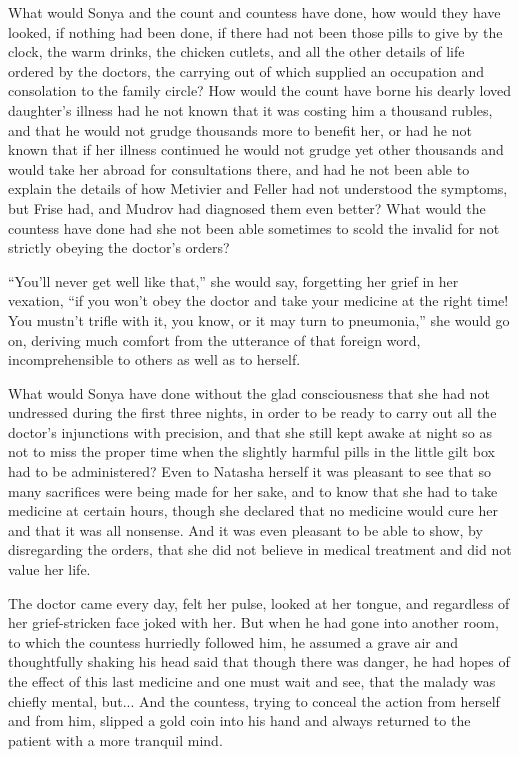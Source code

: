 What would Sonya and the count and countess have done, how would
they have looked, if nothing had been done, if there had not been
those pills to give by the clock, the warm drinks, the chicken
cutlets, and all the other details of life ordered by the
doctors, the carrying out of which supplied an occupation and
consolation to the family circle? How would the count have borne
his dearly loved daughter's illness had he not known that it was
costing him a thousand rubles, and that he would not grudge
thousands more to benefit her, or had he not known that if her
illness continued he would not grudge yet other thousands and
would take her abroad for consultations there, and had he not
been able to explain the details of how Metivier and Feller had
not understood the symptoms, but Frise had, and Mudrov had
diagnosed them even better? What would the countess have done had
she not been able sometimes to scold the invalid for not strictly
obeying the doctor's orders?

``You'll never get well like that,'' she would say, forgetting
her grief in her vexation, ``if you won't obey the doctor and
take your medicine at the right time! You mustn't trifle with it,
you know, or it may turn to pneumonia,'' she would go on,
deriving much comfort from the utterance of that foreign word,
incomprehensible to others as well as to herself.

What would Sonya have done without the glad consciousness that
she had not undressed during the first three nights, in order to
be ready to carry out all the doctor's injunctions with
precision, and that she still kept awake at night so as not to
miss the proper time when the slightly harmful pills in the
little gilt box had to be administered?  Even to Natasha herself
it was pleasant to see that so many sacrifices were being made
for her sake, and to know that she had to take medicine at
certain hours, though she declared that no medicine would cure
her and that it was all nonsense. And it was even pleasant to be
able to show, by disregarding the orders, that she did not
believe in medical treatment and did not value her life.

The doctor came every day, felt her pulse, looked at her tongue,
and regardless of her grief-stricken face joked with her. But
when he had gone into another room, to which the countess
hurriedly followed him, he assumed a grave air and thoughtfully
shaking his head said that though there was danger, he had hopes
of the effect of this last medicine and one must wait and see,
that the malady was chiefly mental, but... And the countess,
trying to conceal the action from herself and from him, slipped a
gold coin into his hand and always returned to the patient with a
more tranquil mind.

